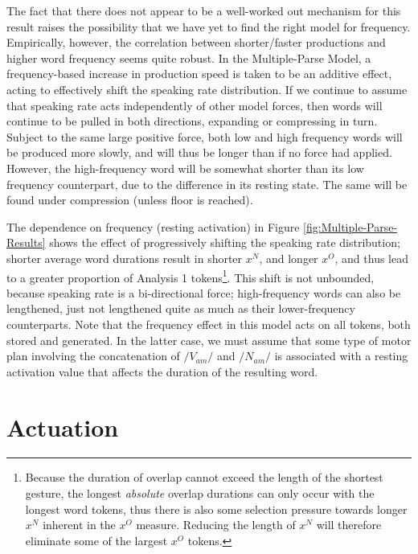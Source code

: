 The fact that there does not appear to be a well-worked out mechanism
for this result raises the possibility that we have yet to find the
right model for frequency. Empirically, however, the correlation between
shorter/faster productions and higher word frequency seems quite robust.
In the Multiple-Parse Model, a frequency-based increase in production
speed is taken to be an additive effect, acting to effectively shift
the speaking rate distribution. If we continue to assume that speaking
rate acts independently of other model forces, then words will continue
to be pulled in both directions, expanding or compressing in turn.
Subject to the same large positive force, both low and high frequency
words will be produced more slowly, and will thus be longer than if
no force had applied. However, the high-frequency word will be somewhat
shorter than its low frequency counterpart, due to the difference
in its resting state. The same will be found under compression (unless
floor is reached).

The dependence on frequency (resting activation) in Figure \ref{fig:Multiple-Parse-Results}
shows the effect of progressively shifting the speaking rate distribution;
shorter average word durations result in shorter $x^{N}$, and longer
$x^{O}$, and thus lead to a greater proportion of Analysis 1 tokens\footnote{Because the duration of overlap cannot exceed the length of the shortest
gesture, the longest \emph{absolute} overlap durations can only occur
with the longest word tokens, thus there is also some selection pressure
towards longer $x^{N}$ inherent in the $x^{O}$ measure. Reducing
the length of $x^{N}$ will therefore eliminate some of the largest
$x^{O}$ tokens.}. This shift is not unbounded, because speaking rate is a bi-directional
force; high-frequency words can also be lengthened, just not lengthened
quite as much as their lower-frequency counterparts. Note that the
frequency effect in this model acts on all tokens, both stored and
generated. In the latter case, we must assume that some type of motor
plan involving the concatenation of $/V_{am}/$ and $/N_{am}/$ is
associated with a resting activation value that affects the duration
of the resulting word. 

\section{Actuation }

